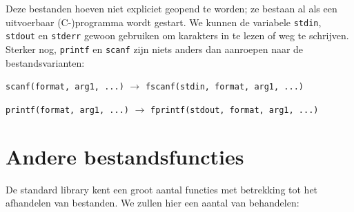 Deze bestanden hoeven niet expliciet geopend te worden; ze bestaan al als een uitvoerbaar (C-)programma wordt gestart. We kunnen de variabele \texttt{stdin}, \texttt{stdout} en \texttt{stderr} gewoon gebruiken om karakters in te lezen of weg te schrijven. Sterker nog, \texttt{printf} en \texttt{scanf} zijn niets anders dan aanroepen naar de bestandsvarianten:

\hspace*{1em}\texttt{scanf(format, arg1, ...)} $\longrightarrow$ \texttt{fscanf(stdin, format, arg1, ...)}

\hspace*{1em}\texttt{printf(format, arg1, ...)} $\longrightarrow$ \texttt{fprintf(stdout, format, arg1, ...)}

\section{Andere bestandsfuncties}
\label{sec:anderebestandsfuncties}
De standard library kent een groot aantal functies met betrekking tot het afhandelen van bestanden. We zullen hier een aantal van behandelen:

